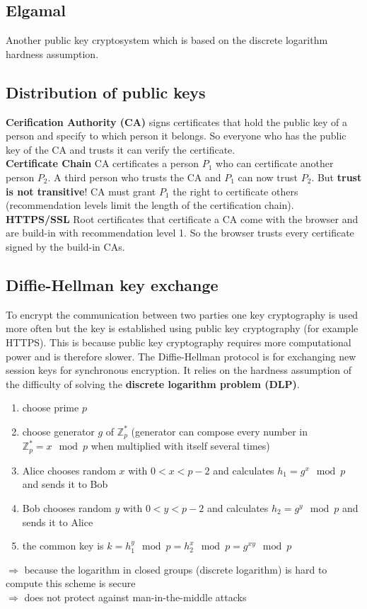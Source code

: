 \documentclass[12pt]{article}
\begin{document}
	\subsection{Elgamal}
	Another public key cryptosystem which is based on the discrete logarithm hardness assumption.
	
	\subsection{Distribution of public keys}
	\textbf{Cerification Authority (CA)} signs certificates that hold the public key of a person and specify to which person it belongs. So everyone who has the public key of the CA and trusts it can verify the certificate.\\
	\textbf{Certificate Chain} CA certificates a person $P_1$ who can certificate another person $P_2$. A third person who trusts the CA and $P_1$ can now trust $P_2$. But \textbf{trust is not transitive}! CA must grant $P_1$ the right to certificate others (recommendation levels limit the length of the certification chain).\\
	\textbf{HTTPS/SSL} Root certificates that certificate a CA come with the browser and are build-in with recommendation level 1. So the browser trusts every certificate signed by the build-in CAs.
	
	\subsection{Diffie-Hellman key exchange}
	To encrypt the communication between two parties one key cryptography is used more often but the key is established using public key cryptography (for example HTTPS). This is because public key cryptography requires more computational power and is therefore slower. The Diffie-Hellman protocol is for exchanging new session keys for synchronous encryption. It relies on the hardness assumption of the difficulty of solving the \textbf{discrete logarithm problem (DLP)}.
	\begin{enumerate}
		\item choose prime $p$
		\item choose generator $g$ of $\mathbb{Z}_p^*$ (generator can compose every number in $\mathbb{Z}_p^* = x \mod p$ when multiplied with itself several times)
		\item Alice chooses random $x$ with $0 < x < p-2$ and calculates $h_1 = g^x \mod p$ and sends it to Bob
		\item Bob chooses random $y$ with $0 < y < p-2$ and calculates $h_2 = g^y \mod p$ and sends it to Alice
		\item the common key is $k = h_1^y \mod p = h_2^x \mod p = g^{xy} \mod p$
	\end{enumerate}
	$\Rightarrow$ because the logarithm in closed groups (discrete logarithm) is hard to compute this scheme is secure\\
	$\Rightarrow$ does not protect against man-in-the-middle attacks
	
\end{document}
